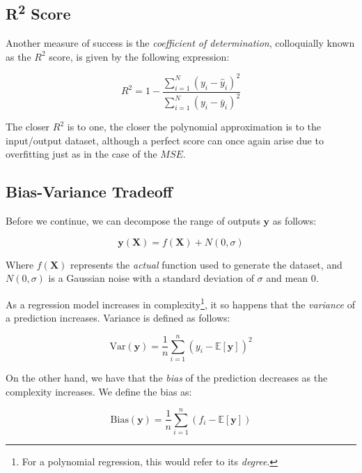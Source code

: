 \documentclass[a4paper,10pt,english]{article}
\begin{document}
\subsection*{R\textsuperscript{2} Score}

Another measure of success is the \textit{coefficient of determination}, colloquially known as the $R^2$ score, is given by the following expression:

\begin{equation}
R^2 = 1 - \frac{\sum_{i=1}^N (y_i - \hat{y}_i)^2 }{\sum_{i=1}^N (y_i - \bar{y}_i)^2 }
\end{equation}

The closer $R^2$ is to one, the closer the polynomial approximation is to the input/output dataset, although a perfect score can once again arise due to overfitting just as in the case of the $MSE$.

\subsection{Bias-Variance Tradeoff}

Before we continue, we can decompose the range of outputs $\mathbf{y}$ as follows:

\begin{equation}
\label{eq_method_5}
\mathbf{y}(\mathbf{X}) = f(\mathbf{X}) + N(0, \sigma) 
\end{equation}

Where $f(\mathbf{X})$ represents the \textit{actual} function used to generate the dataset, and $N(0,\sigma)$ is a Gaussian noise with a standard deviation of $\sigma$ and mean 0.

As a regression model increases in complexity\footnote{For a polynomial regression, this would refer to its \textit{degree}.}, it so happens that the \textit{variance} of a prediction increases.  Variance is defined as follows:

\begin{equation}
\label{eq_method_6}
\text{Var}(\mathbf{y}) = \frac{1}{n} \sum_{i=1}^{n} (y_i - \mathbb{E}[\mathbf{y}] )^2
\end{equation}

On the other hand, we have that the \textit{bias} of the prediction decreases as the complexity increases.  We define the bias as:

\begin{equation}
\label{eq_method_7}
\text{Bias}(\mathbf{y}) = \frac{1}{n} \sum_{i=1}^{n} (f_i - \mathbb{E}[\mathbf{y}] )
\end{equation}
\end{document}
